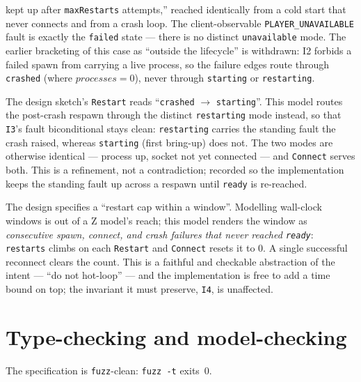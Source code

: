 \documentclass[a4paper,10pt,fleqn]{article}
\begin{document}
\begin{description}
    kept up after \texttt{maxRestarts} attempts,'' reached identically from a
    cold start that never connects and from a crash loop. The client-observable
    \texttt{PLAYER\_UNAVAILABLE} fault is exactly the \texttt{failed} state ---
    there is no distinct \texttt{unavailable} mode. The earlier bracketing of
    this case as ``outside the lifecycle'' is withdrawn: I2 forbids a failed
    spawn from carrying a live process, so the failure edges route through
    \texttt{crashed} (where $processes = 0$), never through \texttt{starting} or
    \texttt{restarting}.
  \item[Observation~B --- \texttt{restarting} versus reusing \texttt{starting}.]
    The design sketch's \texttt{Restart} reads ``\texttt{crashed} $\to$
    \texttt{starting}''. This model routes the post-crash respawn through the
    distinct \texttt{restarting} mode instead, so that \texttt{I3}'s fault
    biconditional stays clean: \texttt{restarting} carries the standing fault
    the crash raised, whereas \texttt{starting} (first bring-up) does not. The
    two modes are otherwise identical --- process up, socket not yet connected
    --- and \texttt{Connect} serves both. This is a refinement, not a
    contradiction; recorded so the implementation keeps the standing fault up
    across a respawn until \texttt{ready} is re-reached.
  \item[Observation~C --- the restart window is modelled as consecutive
    non-ready attempts.] The design specifies a ``restart cap within a window''.
    Modelling wall-clock windows is out of a Z model's reach; this model renders
    the window as \emph{consecutive spawn, connect, and crash failures that never
    reached \texttt{ready}}: \texttt{restarts} climbs on each \texttt{Restart}
    and \texttt{Connect} resets it to $0$. A single successful reconnect clears
    the count. This is a
    faithful and checkable abstraction of the intent --- ``do not hot-loop'' ---
    and the implementation is free to add a time bound on top; the invariant it
    must preserve, \texttt{I4}, is unaffected.
\end{description}

\section{Type-checking and model-checking}
\label{sec:results}

The specification is \texttt{fuzz}-clean: \texttt{fuzz -t} exits~0.
\end{document}

